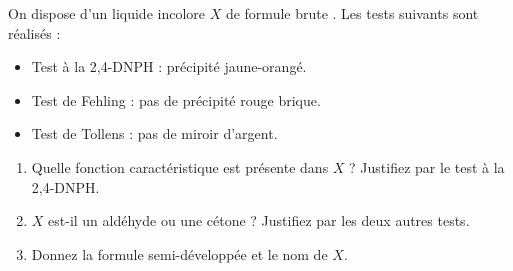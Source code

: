 \documentclass[11pt]{article}
\begin{document}
\begin{exercice}
\noindent On dispose d'un liquide incolore $X$ de formule brute . Les tests suivants sont réalisés :
\begin{itemize}
    \item Test à la 2,4-DNPH : précipité jaune-orangé.
    \item Test de Fehling : pas de précipité rouge brique.
    \item Test de Tollens : pas de miroir d'argent.
\end{itemize}
\begin{enumerate}
    \item Quelle fonction caractéristique est présente dans $X$ ? Justifiez par le test à la 2,4-DNPH.
    \item $X$ est-il un aldéhyde ou une cétone ? Justifiez par les deux autres tests.
    \item Donnez la formule semi-développée et le nom de $X$.
\end{enumerate}
\end{exercice}
\end{document}
